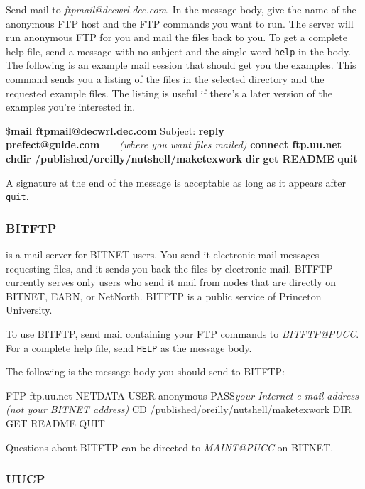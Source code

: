 Send mail to {\it ftpmail@decwrl.dec.com}. In the message body, give the
name of the anonymous FTP host and the FTP commands you want to run.  The
server will run anonymous FTP for you and mail the files back to you.  To get
a complete help file, send a message with no subject and the single word
\texttt{help} in the body. The following is an example mail session that should get
you the examples. This command sends you a listing of the files in the
selected directory and the requested example files. The listing is useful if
there's a later version of the examples you're interested in.

\begin{ttindent}
\${\bf mail ftpmail@decwrl.dec.com} 
Subject: {\bf{}reply prefect@guide.com}\ \ \ \ {\rm\it\small (where you want files mailed)} 
{\bf{}connect ftp.uu.net}
{\bf{}chdir /published/oreilly/nutshell/maketexwork} 
{\bf{}dir} 
{\bf{}get README} 
{\bf{}quit}
\end{ttindent}

A signature at the end of the message is acceptable as long as it appears
after \texttt{quit}.

\subsubsection{BITFTP}

 is a mail server for BITNET users. You
send it electronic mail messages requesting files, and it sends you back the
files by electronic mail. BITFTP currently serves only users who send it mail
from nodes that are directly on BITNET, EARN, or NetNorth. BITFTP is a public
service of Princeton University.

To use BITFTP, send mail containing your FTP commands to {\it
BITFTP@PUCC}. For a complete help file, send \texttt{HELP} as the message body.

The following is the message body you should send to BITFTP:

\begin{ttindent} 
FTP ftp.uu.net 
NETDATA USER anonymous 
PASS{\it your Internet e-mail address}      {\rm\it\small (not your BITNET address)} 
CD /published/oreilly/nutshell/maketexwork 
DIR 
GET README 
QUIT
\end{ttindent}

Questions about BITFTP can be directed to {\it MAINT@PUCC} on BITNET.

\subsubsection{UUCP}

